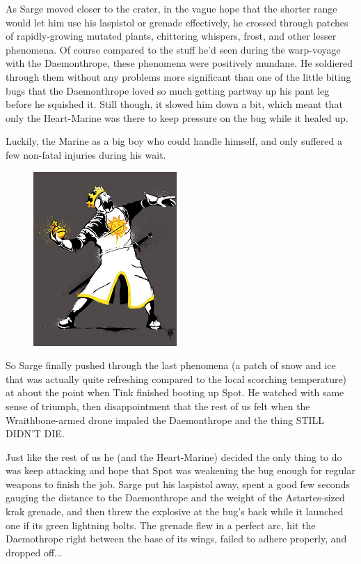 As Sarge moved closer to the crater, in the vague hope that the shorter range would let him use his laspistol or grenade effectively, he crossed through patches of rapidly-growing mutated plants, chittering whispers, frost, and other lesser phenomena. 
Of course compared to the stuff he'd seen during the warp-voyage with the Daemonthrope, these phenomena were positively mundane. 
He soldiered through them without any problems more significant than one of the little biting bugs that the Daemonthrope loved so much getting partway up his pant leg before he squished it. 
Still though, it slowed him down a bit, which meant that only the Heart-Marine was there to keep pressure on the bug while it healed up.

Luckily, the Marine as a big boy who could handle himself, and only suffered a few non-fatal injuries during his wait.

\begin{figure}
	\begin{center}
		\includegraphics[width=\figwidth]{pics/16/57.png}
	\end{center}
\end{figure}
So Sarge finally pushed through the last phenomena (a patch of snow and ice that was actually quite refreshing compared to the local scorching temperature) at about the point when Tink finished booting up Spot. 
He watched with same sense of triumph, then disappointment that the rest of us felt when the Wraithbone-armed drone impaled the Daemonthrope and the thing STILL DIDN'T DIE. 


Just like the rest of us he (and the Heart-Marine) decided the only thing to do was keep attacking and hope that Spot was weakening the bug enough for regular weapons to finish the job. 
Sarge put his laspistol away, spent a good few seconds gauging the distance to the Daemonthrope and the weight of the Astartes-sized krak grenade, and then threw the explosive at the bug's back while it launched one if its green lightning bolts. 
The grenade flew in a perfect arc, hit the Daemothrope right between the base of its wings, failed to adhere properly, and dropped off...

